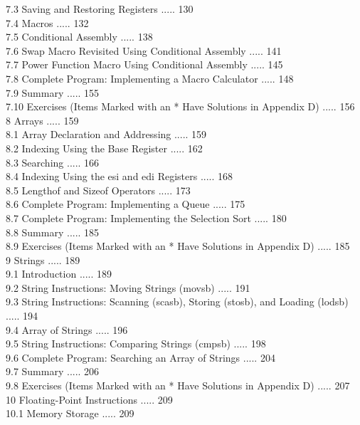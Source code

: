 \documentclass[10pt]{book}
\begin{document}
7.3 Saving and Restoring Registers ..... 130\\
7.4 Macros ..... 132\\
7.5 Conditional Assembly ..... 138\\
7.6 Swap Macro Revisited Using Conditional Assembly ..... 141\\
7.7 Power Function Macro Using Conditional Assembly ..... 145\\
7.8 Complete Program: Implementing a Macro Calculator ..... 148\\
7.9 Summary ..... 155\\
7.10 Exercises (Items Marked with an * Have Solutions in Appendix D) ..... 156\\
8 Arrays ..... 159\\
8.1 Array Declaration and Addressing ..... 159\\
8.2 Indexing Using the Base Register ..... 162\\
8.3 Searching ..... 166\\
8.4 Indexing Using the esi and edi Registers ..... 168\\
8.5 Lengthof and Sizeof Operators ..... 173\\
8.6 Complete Program: Implementing a Queue ..... 175\\
8.7 Complete Program: Implementing the Selection Sort ..... 180\\
8.8 Summary ..... 185\\
8.9 Exercises (Items Marked with an * Have Solutions in Appendix D) ..... 185\\
9 Strings ..... 189\\
9.1 Introduction ..... 189\\
9.2 String Instructions: Moving Strings (movsb) ..... 191\\
9.3 String Instructions: Scanning (scasb), Storing (stosb), and Loading (lodsb) ..... 194\\
9.4 Array of Strings ..... 196\\
9.5 String Instructions: Comparing Strings (cmpsb) ..... 198\\
9.6 Complete Program: Searching an Array of Strings ..... 204\\
9.7 Summary ..... 206\\
9.8 Exercises (Items Marked with an * Have Solutions in Appendix D) ..... 207\\
10 Floating-Point Instructions ..... 209\\
10.1 Memory Storage ..... 209\\
\end{document}
